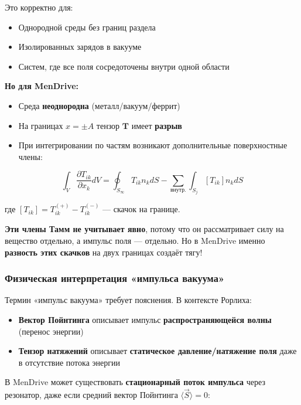 \documentclass[a4paper,12pt]{article}
\begin{document}
Это корректно для:
\begin{itemize}
    \item Однородной среды без границ раздела
    \item Изолированных зарядов в вакууме
    \item Систем, где все поля сосредоточены внутри одной области
\end{itemize}

\textbf{Но для MenDrive:}
\begin{itemize}
    \item Среда \textbf{неоднородна} (металл/вакуум/феррит)
    \item На границах $x = \pm A$ тензор $\mathbf{T}$ имеет \textbf{разрыв}
    \item При интегрировании по частям возникают дополнительные поверхностные
    члены:
\end{itemize}

\begin{equation}
\int_V \frac{\partial T_{ik}}{\partial x_k} dV = \oint_{S_\infty} T_{ik} n_k dS
- \sum_{\text{внутр.}} \int_{S_j} [T_{ik}] n_k dS
\label{eq:gauss_discontinuous}
\end{equation}

где $[T_{ik}] = T_{ik}^{(+)} - T_{ik}^{(-)}$ --- скачок на границе.

\textbf{Эти члены Тамм не учитывает явно}, потому что он рассматривает силу
на вещество отдельно, а импульс поля --- отдельно. Но в MenDrive именно
\textbf{разность этих скачков} на двух границах создаёт тягу!

\subsubsection{Физическая интерпретация «импульса вакуума»}

Термин «импульс вакуума» требует пояснения. В контексте Рорлиха:

\begin{itemize}
    \item \textbf{Вектор Пойнтинга} описывает импульс \textbf{распространяющейся
    волны} (перенос энергии)
    \item \textbf{Тензор натяжений} описывает \textbf{статическое
    давление/натяжение поля} даже в отсутствие потока энергии
\end{itemize}

В MenDrive может существовать \textbf{стационарный поток импульса} через
резонатор, даже если средний вектор Пойнтинга $\langle \vec{S} \rangle = 0$:
\end{document}
